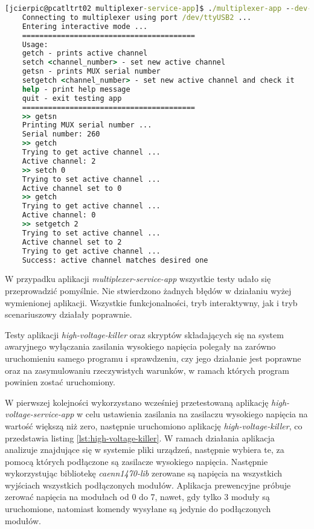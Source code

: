 \begin{lstlisting}[language=cmd,caption={Uruchomienie aplikacji \emph{high-voltage-service-app} w trybie scenariuszowym},label={lst:multiplexer-service-app},frame=single]
    [jcierpic@pcatltrt02 multiplexer-service-app]$ ./multiplexer-app --dev-port /dev/ttyUSB2
    Connecting to multiplexer using port /dev/ttyUSB2 ...
    Entering interactive mode ...
    ========================================
    Usage:
    getch - prints active channel
    setch <channel_number> - set new active channel
    getsn - prints MUX serial number
    setgetch <channel_number> - set new active channel and check it
    help - print help message
    quit - exit testing app
    ========================================
    >> getsn
    Printing MUX serial number ...
    Serial number: 260
    >> getch
    Trying to get active channel ...
    Active channel: 2
    >> setch 0
    Trying to set active channel ...
    Active channel set to 0
    >> getch
    Trying to get active channel ...
    Active channel: 0
    >> setgetch 2
    Trying to set active channel ...
    Active channel set to 2
    Trying to get active channel ...
    Success: active channel matches desired one
\end{lstlisting}

W przypadku aplikacji \emph{multiplexer-service-app} wszystkie testy udało się przeprowadzić pomyślnie. Nie stwierdzono żadnych błędów w działaniu wyżej wymienionej aplikacji. Wszystkie funkcjonalności, tryb interaktywny, jak i tryb scenariuszowy działały poprawnie.

Testy aplikacji \emph{high-voltage-killer} oraz skryptów składających się na system awaryjnego wyłączania zasilania wysokiego napięcia polegały na zarówno uruchomieniu samego programu i sprawdzeniu, czy jego działanie jest poprawne oraz na zasymulowaniu rzeczywistych warunków, w ramach których program powinien zostać uruchomiony.

W pierwszej kolejności wykorzystano wcześniej przetestowaną aplikację \emph{high-voltage-service-app} w celu ustawienia zasilania na zasilaczu wysokiego napięcia na wartość większą niż zero, następnie uruchomiono aplikację \emph{high-voltage-killer}, co przedstawia listing \ref{lst:high-voltage-killer}. W ramach działania aplikacja analizuje znajdujące się w systemie pliki urządzeń, następnie wybiera te, za pomocą których podłączone są zasilacze wysokiego napięcia. Następnie wykorzystując bibliotekę \emph{caenn1470-lib} zerowane są napięcia na wszystkich wyjściach wszystkich podłączonych modułów. Aplikacja prewencyjne próbuje zerować napięcia na modułach od 0 do 7, nawet, gdy tylko 3 moduły są uruchomione, natomiast komendy wysyłane są jedynie do podłączonych modułów.

